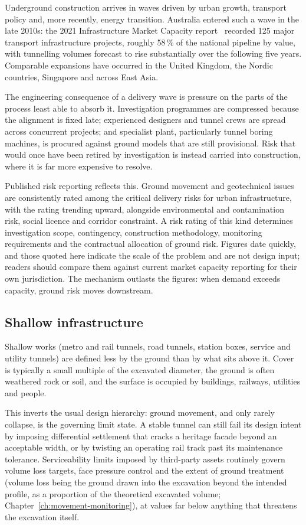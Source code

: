 Underground construction arrives in waves driven by urban growth, transport
policy and, more recently, energy transition. Australia entered such a wave in
the late 2010s: the 2021 Infrastructure Market Capacity
report~\citep{ia2021marketcapacity} recorded 125
major transport infrastructure projects, roughly 58\,\% of the national
pipeline by value, with tunnelling volumes forecast to rise substantially over
the following five years. Comparable expansions have occurred in the United
Kingdom, the Nordic countries, Singapore and across East Asia.

The engineering consequence of a delivery wave is
pressure on the parts of the process least able to absorb it. Investigation
programmes are compressed because the alignment is fixed late; experienced
designers and tunnel crews are spread across concurrent projects; and
specialist plant, particularly tunnel boring machines, is procured against
ground models that are still provisional. Risk that would once have been
retired by investigation is instead carried into construction, where it is far
more expensive to resolve.

Published risk reporting reflects this. Ground movement and geotechnical
issues are consistently rated among the critical delivery risks for urban
infrastructure, with the rating trending upward, alongside environmental and
contamination risk, social licence and corridor constraint. A risk rating of
this kind determines investigation scope,
contingency, construction methodology, monitoring requirements and the
contractual allocation of ground risk. Figures date quickly, and those quoted
here indicate the scale of the problem and are not design input;
readers should compare them against current market capacity reporting for
their own jurisdiction. The mechanism outlasts the figures: when demand exceeds
capacity, ground risk moves downstream.

\subsection{Shallow infrastructure}
\label{sec:shallow-setting}

Shallow works (metro and rail tunnels, road tunnels, station boxes, service
and utility tunnels) are defined less by the ground than by what sits above
it. Cover is typically a small multiple of the excavated diameter, the ground
is often weathered rock or soil, and the surface is occupied by buildings,
railways, utilities and people.

This inverts the usual design hierarchy: ground movement, and only rarely
collapse, is the governing limit state. A stable tunnel can still
fail its design intent by imposing differential settlement that cracks a
heritage facade beyond an acceptable width, or by twisting an operating rail track past its maintenance
tolerance. Serviceability limits imposed by third-party assets routinely
govern volume loss targets, face pressure control and the extent of ground
treatment (volume loss being the ground drawn into the excavation beyond the
intended profile, as a proportion of the theoretical excavated volume;
Chapter~\ref{ch:movement-monitoring}), at values far below anything that threatens the excavation itself.

